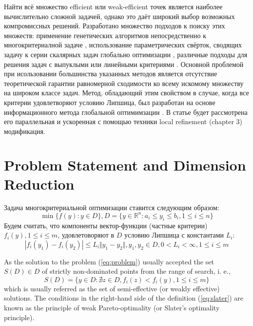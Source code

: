 \documentclass{llncs}
\begin{document}
Найти всё множество efficient или weak-efficient точек является наиболее вычислительно сложной задачей, однако это даёт широкий выбор возможных компромиссных решений. Разработано множество подходов к поиску этих множеств: применение генетических алгоритмов непосредственно к многокритериалной задаче \cite{}, использование параметрических свёрток, сводящих задачу к серии скалярных задач глобально оптимизации \cite{}, различные подходы для решения задач с выпуклыми или линейными критериями \cite{}. Основной проблемой при исользовании большинства указанных методов является отсутствие теоретической гарантии равномерной сходимости ко всему искомому множеству на широком классе задач. Метод, обладающий этим свойством в случае, когда все критерии удовлетворяют условию Липшица, был разработан на основе информационного метода глобальной оптимимзации \cite{}. В статье будет рассмотрена его параллельная и ускоренная с помощью техники local refinement \cite{strOptBook}(chapter 3) модификация.

\section{Problem Statement and Dimension Reduction}
Задача многокритериальной оптимизации ставится следующим образом:
\begin{equation}
  \label{eq:problem}
  \min\{f(y): y\in D\}, D=\{y\in \mathbb{R}^n: a_i \leqslant y_i \leqslant b_i, 1\leqslant i \leqslant n \}
\end{equation}
Будем считать, что компоненты вектор-функции (частные критерии) \(f_i(y), 1\leqslant i\leqslant m\), удовлетоворяют в \(D\) условию Липшица с константами \(L_i\):
\begin{displaymath}
\label{lip}
|f_i(y_1)-f_i(y_2)|\leqslant L_i\Vert y_1-y_2\Vert,y_1,y_2\in D,0<L_i<\infty,1\leqslant i \leqslant m
\end{displaymath}

As the solution to the problem (\ref{eq:problem}) usually accepted the set \(S(D)\in D\) of  strictly non-dominated points from the range of search, i. e.,
\begin{equation}
  \label{eq:slater}
  S(D) = \{y\in D: \nexists z\in D, f_i(z)<f_i(y),1\leqslant i \leqslant m\}
\end{equation}
which is usually referred as the set of semi-effective (or weakly effective) solutions. The conditions in the right-hand side of the definition (\ref{eq:slater}) are known as the principle of weak Pareto-optimality (or Slater's optimality principle).
\end{document}
